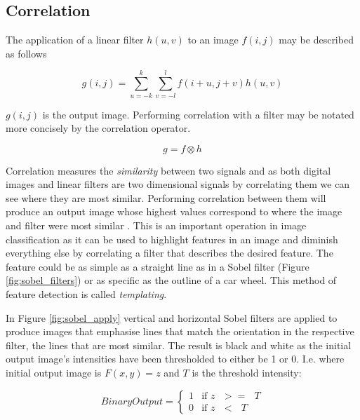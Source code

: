 \subsection{Correlation}
\label{subsection:corr}
The application of a linear filter $h(u,v)$ to an image $f(i,j)$ may be described as follows

\begin{equation} \label{eq:1}
g(i,j) = \sum_{u=-k}^{k}\sum_{v = -l}^{l}f(i+u,j+v)h(u,v)
\end{equation}

$g(i,j)$ is the output image. Performing correlation with a filter may be notated more concisely by the correlation operator.

\[g = f \otimes h\]

Correlation measures the \emph{similarity} between two signals and as both digital images and linear filters are two dimensional signals by correlating them we can see where they are most similar. Performing correlation between them will produce an output image whose highest values correspond to where the image and filter were most similar \cite{optimalKernel}. This is an important operation in image classification as it can be used to highlight features in an image and diminish everything else by correlating a filter that describes the desired feature. The feature could be as simple as a straight line as in a Sobel filter (Figure \ref{fig:sobel_filters}) or as specific as the outline of a car wheel. This method of feature detection is called \emph{templating}.

In Figure \ref{fig:sobel_apply} vertical and horizontal Sobel filters are applied to produce images that emphasise lines that match the orientation in the respective filter, the lines that are most similar. The result is black and white as the initial output image's intensities have been thresholded to either be 1 or 0. I.e. where initial output image is $F(x,y) = z$ and $T$ is the threshold intensity:

\begin{equation}
  Binary Output = 
  \begin{cases}
    1 & \text{if $z$ $>=$ $T$} \\
    0 & \text{if $z$ $<$  $T$}
  \end{cases}
\end{equation}

